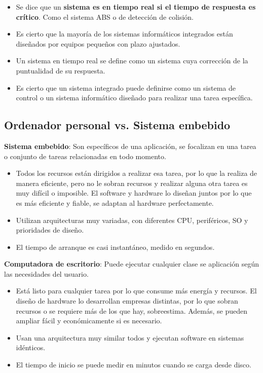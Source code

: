 \documentclass[12pt]{report} %
\begin{document}
\begin{itemize}

\item
  Se dice que un \textbf{sistema es en tiempo real si el tiempo de
  respuesta es crítico}. Como el sistema ABS o de detección de colisión.
\item
  Es cierto que la mayoría de los sistemas informáticos integrados están
  diseñados por equipos pequeños con plazo ajustados.
\item
  Un sistema en tiempo real se define como un sistema cuya corrección de
  la puntualidad de su respuesta.
\item
  Es cierto que un sistema integrado puede definirse como un sistema de
  control o un sistema informático diseñado para realizar una tarea
  específica.
\end{itemize}

\subsection{Ordenador personal vs. Sistema
embebido}

\textbf{Sistema embebido}: Son específicos de una aplicación, se
focalizan en una tarea o conjunto de tareas relacionadas en todo
momento.

\begin{itemize}

\item
  Todos los recursos están dirigidos a realizar esa tarea, por lo que la
  realiza de manera eficiente, pero no le sobran recursos y realizar alguna otra tarea es
  muy difícil o imposible. El software y hardware lo diseñan juntos por
  lo que es más eficiente y fiable, se adaptan al hardware
  perfectamente.
\item
  Utilizan arquitecturas muy variadas, con diferentes CPU, periféricos,
  SO y prioridades de diseño.
\item
  El tiempo de arranque es casi instantáneo, medido en segundos.
\end{itemize}

\textbf{Computadora de escritorio}: Puede ejecutar cualquier clase se
aplicación según las necesidades del usuario.

\begin{itemize}

\item
  Está listo para cualquier tarea por lo que consume más energía y
  recursos. El diseño de hardware lo desarrollan empresas distintas, por
  lo que sobran recursos o se requiere más de los que hay, sobreestima.
  Además, se pueden ampliar fácil y económicamente si es necesario.
\item
  Usan una arquitectura muy similar todos y ejecutan software en
  sistemas idénticos.
\item
  El tiempo de inicio se puede medir en minutos cuando se carga desde
  disco.
\end{itemize}
\end{document}

